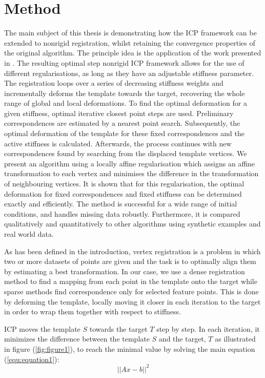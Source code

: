 \documentclass[../structure.tex]{subfiles}
\begin{document}
\chapter{Method}
\hspace{2em}The main subject of this thesis is demonstrating how the ICP framework can be extended to nonrigid registration, whilst retaining the convergence properties of the original algorithm. The principle idea is the application of the work presented in \cite{Amberg2007}. The resulting optimal step nonrigid ICP framework allows for the use of different regularisations, as long as they have an adjustable stiffness parameter. The registration loops over a series of decreasing stiffness weights and incrementally deforms the template towards the target, recovering the whole range of global and local deformations. To find the optimal deformation for a given stiffness, optimal iterative closest point steps are used. Preliminary correspondences are estimated by a nearest point search. Subsequently, the optimal deformation of the template for these fixed correspondences and the active stiffness is calculated. Afterwards, the process continues with new correspondences found by searching from the displaced template vertices. We present an algorithm using a locally affine regularisation which assigns an affine transformation to each vertex and minimises the difference in the transformation of neighbouring vertices. It is shown that for this regularisation, the optimal deformation for fixed correspondences and fixed stiffness can be determined exactly and efficiently. The method is successful for a wide range of initial conditions, and handles missing data robustly. Furthermore, it is compared qualitatively and quantitatively to other algorithms using synthetic examples and real world data.

\hspace{2em} As has been defined in the introduction, vertex registration is a problem in which two or more datasets of points are given and the task is to optimally align them by estimating a best transformation. In our case, we use a dense registration method to find a mapping from each point in the template onto the target while sparse methods find correspondence only for selected feature points. This is done by deforming the template, locally moving it closer in each iteration to the target in order to wrap them together with respect to stiffness.

\hspace{2em}ICP moves the template $S$ towards the target $T$ step by step. In each iteration, it minimizes the difference between the template $S$ and the target, $T$ as illustrated in figure (\ref{fig:figure1}), to reach the minimal value by solving the main equation (\ref{equ:equation1}):
\begin{equation}
\label{equ:equation1}
||Ax-b||^2
\end{equation}
\end{document}
